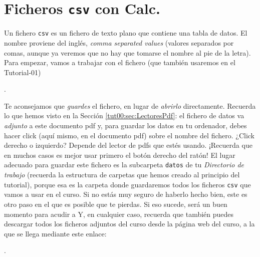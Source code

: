 \documentclass[10pt,a4paper]{article}\usepackage[]{graphicx}\usepackage[]{color}
\newcounter {cont01}
\begin{document}
\section{Ficheros {\tt csv} con Calc.}
\label{tut00:sec:FicherosCsvConCalc}

Un fichero {\tt csv} es un fichero de texto plano que contiene una tabla de datos. El nombre
proviene del inglés, {\em comma separated values} (valores separados por comas, aunque ya veremos
que no hay que tomarse el nombre al pie de la letra).  Para empezar, vamos a trabajar con el
fichero (que también usaremos en el Tutorial-01)
\begin{center}
.
\end{center}
Te aconsejamos que {\em guardes} el fichero, en lugar de {\em abrirlo} directamente. Recuerda lo que hemos
visto en la Sección \ref{tut00:sec:LectoresPdf}: el fichero de datos va {\em adjunto} a
este documento pdf y, para guardar los datos en tu ordenador, debes hacer click (aquí mismo, en el
documento pdf) sobre el nombre del fichero. ¿Click derecho o izquierdo? Depende del lector de pdfs
que estés usando. ¡Recuerda que en muchos casos es mejor usar primero el botón derecho del ratón!
El lugar adecuado para guardar este fichero es la subcarpeta {\tt datos} de tu {\em Directorio de trabajo} (recuerda la estructura de carpetas que 
hemos creado al principio del tutorial), porque esa es la carpeta donde guardaremos todos los ficheros 
{\tt csv} que vamos a usar en el curso. Si no estás muy seguro de haberlo hecho bien, este es otro paso en el que es posible que te pierdas. Si eso
sucede, será un buen momento para acudir a  Y, en cualquier caso, recuerda
que también puedes descargar todos los ficheros adjuntos del curso desde la página web del curso, a la que se llega mediante este enlace:
\begin{center}
.
\end{center}
\end{document}
